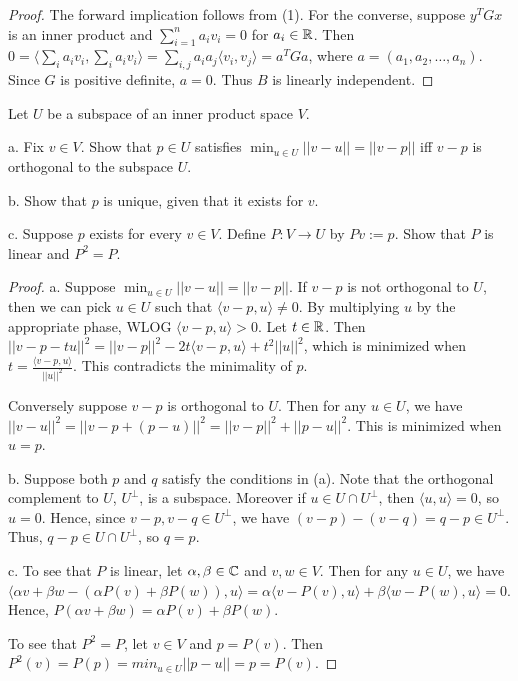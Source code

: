 \documentclass{article}
\begin{document}
{{\begin{proof}
The forward implication follows from (1).  For the converse, suppose $y^T G x$ is an inner product and $\sum_{i=1}^n a_i v_i = 0$ for $a_i \in \mathbb{R}$. Then $0 = \langle \sum_i a_i v_i , \sum_i a_i v_i \rangle 
= \sum_{i,j} a_i a_j \langle v_i, v_j \rangle
=  a^T G a$,
where $a = (a_1, a_2, \ldots, a_n)$.  Since $G$ is positive definite, $a = 0$. Thus $B$ is linearly independent.
\end{proof}

 Let $U$ be a subspace of an inner product space $V$.

a. Fix $v \in V$. Show that $p \in U$ satisfies $\min_{u \in U} ||v - u || = || v - p||$ iff $v - p$ is orthogonal to the subspace $U$.

b. Show that $p$ is unique, given that it exists for $v$.

c. Suppose $p$ exists for every $v \in V$. Define $P: V \to U$ by $Pv := p$. Show that $P$ is linear and $P^2 = P$.

\begin{proof}
a. Suppose $\min_{u \in U} ||v - u || = || v - p||$.  If $v-p$ is not orthogonal to $U$, then we can pick $u \in U$ such that $\langle v - p, u \rangle \ne 0$. By multiplying $u$ by the appropriate phase, WLOG $\langle v - p , u \rangle > 0$.  Let $t \in \mathbb{R}$. Then 
$||v - p - tu||^2 
= ||v - p||^2  - 2t \langle v - p , u \rangle + t^2 ||u||^2$, 
which is minimized when $t = \frac {\langle v - p , u \rangle} {||u||^2}$.  This contradicts the minimality of $p$.

Conversely suppose $v - p$ is orthogonal to $U$. Then for any $u \in U$, we have $||v - u||^2 = || v - p + (p-u)||^2 
= ||v - p||^2 + ||p - u||^2$.  This is minimized when $u = p$.

b. Suppose both $p$ and $q$ satisfy the conditions in (a).  Note that the orthogonal complement to $U$, $U^\perp$, is a subspace. Moreover if $u \in U \cap U^\perp$, then $\langle u, u \rangle = 0$, so $u = 0$.  Hence, since $v - p, v - q \in U^\perp$, we have $(v-p) - (v-q) = q-p \in U^\perp$.  Thus, $q-p \in U \cap U^\perp$, so $q = p$.

c. To see that $P$ is linear, let $\alpha, \beta \in \mathbb{C}$ and $v,w \in V$.  Then for any $u \in U$, we have $\langle \alpha v + \beta w - (\alpha P(v) + \beta P(w)), u \rangle 
= \alpha\langle v - P(v), u\rangle + \beta \langle w - P(w), u \rangle
= 0$.  Hence, $P(\alpha v + \beta w) = \alpha P(v) + \beta P(w)$.

To see that $P^2 = P$,  let $v \in V$ and $p = P(v)$.  Then $P^2(v) = P(p) = min_{u\in U} || p - u || = p = P(v)$.
\end{proof}

}}
\end{document}
